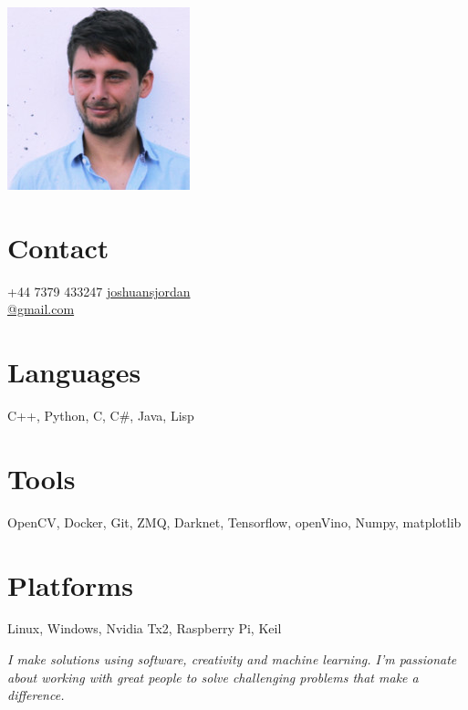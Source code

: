 \documentclass[print]{friggeri-cv} %
\begin{document}

\begin{aside} %
\includegraphics[width=0.6\columnwidth]{0.jpg} %
\section{Contact}
+44 7379 433247
\href{mailto:joshuansjordan@gmail.com}{joshuansjordan\\@gmail.com}
\section{Languages}
C++, Python, C, C\#, Java, Lisp
\section{Tools}
OpenCV, Docker, Git, ZMQ, Darknet, Tensorflow, openVino, Numpy, matplotlib
\section{Platforms}
Linux, Windows, Nvidia Tx2, Raspberry Pi, Keil
\end{aside}

\emph{I make solutions using software, creativity and machine learning. I'm passionate about working with great people to solve challenging problems that make a difference.}
\end{document}
